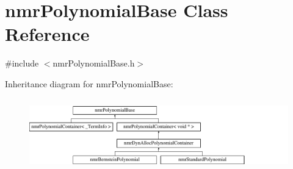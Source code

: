 \hypertarget{classnmr_polynomial_base}{\section{nmr\-Polynomial\-Base Class Reference}
\label{classnmr_polynomial_base}
}


{\ttfamily \#include $<$nmr\-Polynomial\-Base.\-h$>$}

Inheritance diagram for nmr\-Polynomial\-Base\-:\begin{figure}[H]
\begin{center}
\leavevmode
\includegraphics[height=3.150492cm]{d8/d51/classnmr_polynomial_base}
\end{center}
\end{figure}

